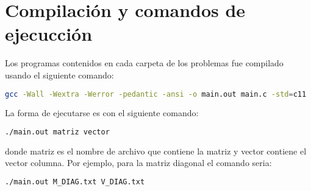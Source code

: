 \section{Compilación y comandos de ejecucción}

Los programas contenidos en cada carpeta de los problemas fue compilado usando el siguiente comando:

\begin{lstlisting}[language=bash]
    gcc -Wall -Wextra -Werror -pedantic -ansi -o main.out main.c -std=c11
\end{lstlisting}

La forma de ejecutarse es con el siguiente comando:

\begin{lstlisting}[language=bash]
    ./main.out matriz vector
\end{lstlisting}

donde matriz es el nombre de archivo que contiene la matriz y vector contiene el vector columna. Por ejemplo, para la matriz diagonal el comando seria:

\begin{lstlisting}[language=bash]
    ./main.out M_DIAG.txt V_DIAG.txt
\end{lstlisting}